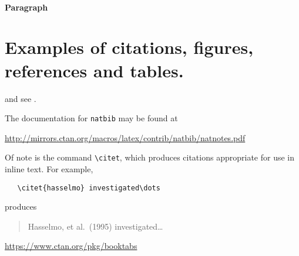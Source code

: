 \documentclass{article}
\begin{document}
\paragraph{Paragraph}
\lipsum[7]

\section{Examples of citations, figures, references and tables.}
\label{sec:others}
\lipsum[8] \cite{kour2014real,kour2014fast} and see \cite{hadash2018estimate}.

The documentation for \verb+natbib+ may be found at
\begin{center}
  \url{http://mirrors.ctan.org/macros/latex/contrib/natbib/natnotes.pdf}
\end{center}
Of note is the command \verb+\citet+, which produces citations
appropriate for use in inline text.  For example,
\begin{verbatim}
   \citet{hasselmo} investigated\dots
\end{verbatim}
produces
\begin{quote}
  Hasselmo, et al.\ (1995) investigated\dots
\end{quote}

\begin{center}
  \url{https://www.ctan.org/pkg/booktabs}
\end{center}
\end{document}
